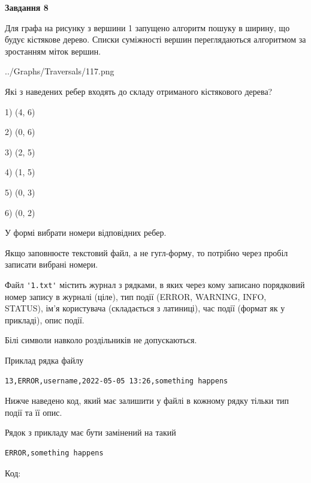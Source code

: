 \documentclass[12pt, ukrainian]{article}
\def\code#1{\Verb!#1!}
\begin{document}
{\begin {large}
{\begin {center}\textbf{Завдання 8}\end {center}}\par
Для графа на рисунку з вершини 1 запущено алгоритм пошуку в ширину, що будує кістякове дерево. Списки суміжності вершин переглядаються алгоритмом за зростанням міток вершин.\par
\begin{center}
	{../Graphs/Traversals/117.png}
\end{center}
\par Які з наведених ребер входять до складу отриманого кістякового дерева?\par
1) (4, 6)\par
2) (0, 6)\par
3) (2, 5)\par
4) (1, 5)\par
5) (0, 3)\par
6) (0, 2)\par
{\vskip 15pt} У формі вибрати номери відповідних ребер.


Якщо заповнюєте текстовий файл, а не гугл-форму, то потрібно через пробіл записа\-ти вибрані номери.\par
\newpage


Файл \code{'1.txt'} містить журнал з рядками, в яких через кому записано поряд\-ко\-вий номер запису в журналі (ціле), тип події (ERROR, WARNING, INFO, STATUS), ім'я користувача (складається з латиниці), час події (фор\-мат як у прикладі), опис події.

Білі символи навколо роздільників не допускаються.

Приклад рядка файлу



\begin{verbatim}
13,ERROR,username,2022-05-05 13:26,something happens
\end{verbatim}


Нижче наведено код, який має залишити у файлі в кожному рядку тільки тип події та її опис.

Рядок з прикладу має бути замінений на такий



\begin{verbatim}
ERROR,something happens
\end{verbatim}




Код:




\end{large}}
\end{document}
